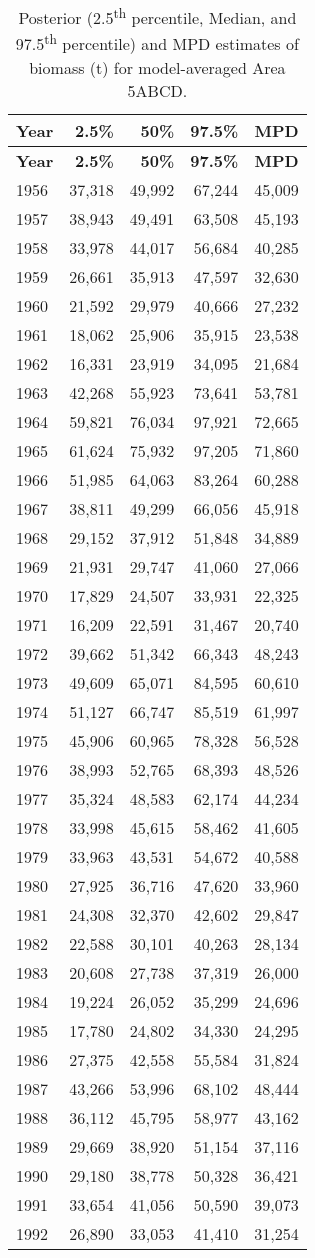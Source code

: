 \documentclass[11pt]{book}
\begin{document}
\begin{longtable}[]{@{}lrrrr@{}}
\caption{\label{tab:tab-post-biomass-avg-5abcd}Posterior (2.5\textsuperscript{th} percentile, Median, and 97.5\textsuperscript{th} percentile) and MPD estimates of biomass (t) for model-averaged Area 5ABCD.}\tabularnewline
\toprule
\textbf{Year} & \textbf{2.5\%} & \textbf{50\%} & \textbf{97.5\%} & \textbf{MPD}\tabularnewline
\midrule
\endfirsthead
\toprule
\textbf{Year} & \textbf{2.5\%} & \textbf{50\%} & \textbf{97.5\%} & \textbf{MPD}\tabularnewline
\midrule
\endhead
1956 & 37,318 & 49,992 & 67,244 & 45,009\tabularnewline
1957 & 38,943 & 49,491 & 63,508 & 45,193\tabularnewline
1958 & 33,978 & 44,017 & 56,684 & 40,285\tabularnewline
1959 & 26,661 & 35,913 & 47,597 & 32,630\tabularnewline
1960 & 21,592 & 29,979 & 40,666 & 27,232\tabularnewline
1961 & 18,062 & 25,906 & 35,915 & 23,538\tabularnewline
1962 & 16,331 & 23,919 & 34,095 & 21,684\tabularnewline
1963 & 42,268 & 55,923 & 73,641 & 53,781\tabularnewline
1964 & 59,821 & 76,034 & 97,921 & 72,665\tabularnewline
1965 & 61,624 & 75,932 & 97,205 & 71,860\tabularnewline
1966 & 51,985 & 64,063 & 83,264 & 60,288\tabularnewline
1967 & 38,811 & 49,299 & 66,056 & 45,918\tabularnewline
1968 & 29,152 & 37,912 & 51,848 & 34,889\tabularnewline
1969 & 21,931 & 29,747 & 41,060 & 27,066\tabularnewline
1970 & 17,829 & 24,507 & 33,931 & 22,325\tabularnewline
1971 & 16,209 & 22,591 & 31,467 & 20,740\tabularnewline
1972 & 39,662 & 51,342 & 66,343 & 48,243\tabularnewline
1973 & 49,609 & 65,071 & 84,595 & 60,610\tabularnewline
1974 & 51,127 & 66,747 & 85,519 & 61,997\tabularnewline
1975 & 45,906 & 60,965 & 78,328 & 56,528\tabularnewline
1976 & 38,993 & 52,765 & 68,393 & 48,526\tabularnewline
1977 & 35,324 & 48,583 & 62,174 & 44,234\tabularnewline
1978 & 33,998 & 45,615 & 58,462 & 41,605\tabularnewline
1979 & 33,963 & 43,531 & 54,672 & 40,588\tabularnewline
1980 & 27,925 & 36,716 & 47,620 & 33,960\tabularnewline
1981 & 24,308 & 32,370 & 42,602 & 29,847\tabularnewline
1982 & 22,588 & 30,101 & 40,263 & 28,134\tabularnewline
1983 & 20,608 & 27,738 & 37,319 & 26,000\tabularnewline
1984 & 19,224 & 26,052 & 35,299 & 24,696\tabularnewline
1985 & 17,780 & 24,802 & 34,330 & 24,295\tabularnewline
1986 & 27,375 & 42,558 & 55,584 & 31,824\tabularnewline
1987 & 43,266 & 53,996 & 68,102 & 48,444\tabularnewline
1988 & 36,112 & 45,795 & 58,977 & 43,162\tabularnewline
1989 & 29,669 & 38,920 & 51,154 & 37,116\tabularnewline
1990 & 29,180 & 38,778 & 50,328 & 36,421\tabularnewline
1991 & 33,654 & 41,056 & 50,590 & 39,073\tabularnewline
1992 & 26,890 & 33,053 & 41,410 & 31,254\tabularnewline

\end{longtable}
\end{document}
